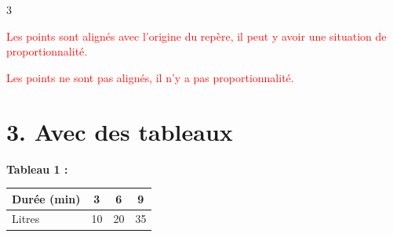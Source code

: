 \documentclass[a4paper]{book}
\begin{document}
{\begin{exerciceNote}{3}
\begin{minipage}{0.30\linewidth}
            \textcolor{red}{Les points sont alignés avec l'origine du repère, il peut y avoir une situation de proportionnalité.}
        \end{minipage}        
        \hfill\vline\hfill
        \begin{minipage}{0.30\linewidth}
            \begin{center}
            \end{center}    

            \medskip 
            
            \textcolor{red}{Les points ne sont pas alignés, il n'y a pas proportionnalité.}
        \end{minipage}

        \section*{3. Avec des tableaux}

        \begin{minipage}{0.45\linewidth}
            \begin{center}
                \textbf{Tableau 1 :} \begin{tabular}{|l|c|c|c|} 
                \hline Durée (min) & 3 & 6 & 9 \\ 
                \hline Litres & 10 & 20 & 35 \\ \hline 
                \end{tabular}
            \end{center}

            \medskip


\end{minipage}
\end{exerciceNote}}
\end{document}
